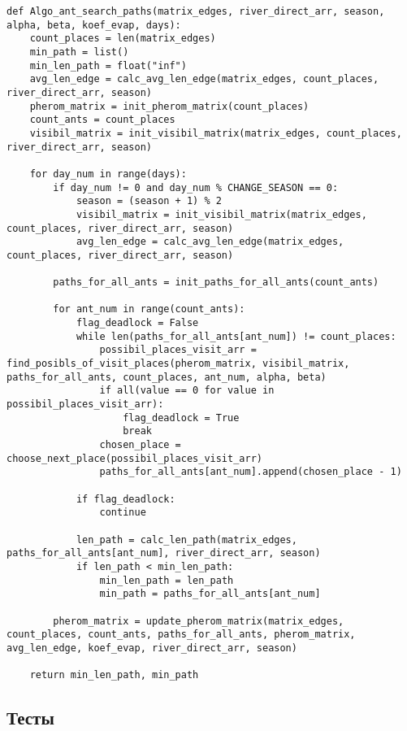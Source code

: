\begin{lstlisting}[caption=реализации алгоритма коммивояжёра муравьиным алгоритмом, label=lst:main_ant_algo]
def Algo_ant_search_paths(matrix_edges, river_direct_arr, season, alpha, beta, koef_evap, days):
    count_places = len(matrix_edges)
    min_path = list()
    min_len_path = float("inf")
    avg_len_edge = calc_avg_len_edge(matrix_edges, count_places, river_direct_arr, season)
    pherom_matrix = init_pherom_matrix(count_places)
    count_ants = count_places
    visibil_matrix = init_visibil_matrix(matrix_edges, count_places, river_direct_arr, season)

    for day_num in range(days):
        if day_num != 0 and day_num % CHANGE_SEASON == 0:
            season = (season + 1) % 2
            visibil_matrix = init_visibil_matrix(matrix_edges, count_places, river_direct_arr, season)
            avg_len_edge = calc_avg_len_edge(matrix_edges, count_places, river_direct_arr, season)
        
        paths_for_all_ants = init_paths_for_all_ants(count_ants)

        for ant_num in range(count_ants):
            flag_deadlock = False
            while len(paths_for_all_ants[ant_num]) != count_places:
                possibil_places_visit_arr = find_posibls_of_visit_places(pherom_matrix, visibil_matrix, paths_for_all_ants, count_places, ant_num, alpha, beta)
                if all(value == 0 for value in possibil_places_visit_arr):
                    flag_deadlock = True
                    break
                chosen_place = choose_next_place(possibil_places_visit_arr)
                paths_for_all_ants[ant_num].append(chosen_place - 1)

            if flag_deadlock:
                continue

            len_path = calc_len_path(matrix_edges, paths_for_all_ants[ant_num], river_direct_arr, season)
            if len_path < min_len_path:
                min_len_path = len_path
                min_path = paths_for_all_ants[ant_num]

        pherom_matrix = update_pherom_matrix(matrix_edges, count_places, count_ants, paths_for_all_ants, pherom_matrix, avg_len_edge, koef_evap, river_direct_arr, season)
    
    return min_len_path, min_path
\end{lstlisting}


\vspace{0.25cm}
\subsection{Тесты}

